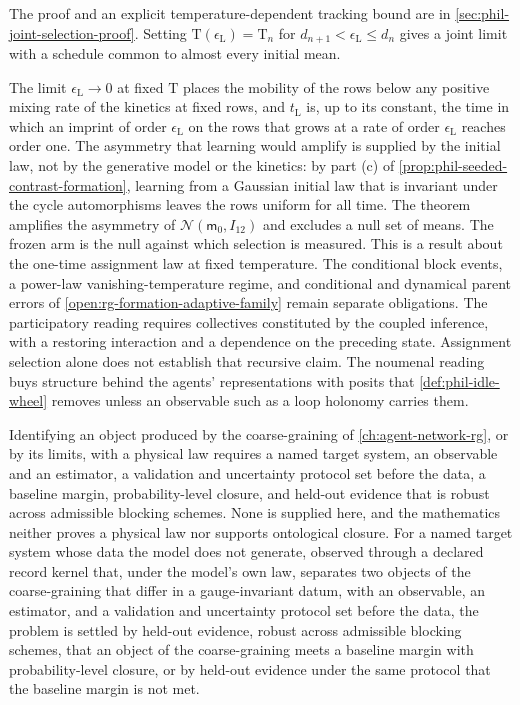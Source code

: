 The proof and an explicit temperature-dependent tracking bound are in
\cref{sec:phil-joint-selection-proof}. Setting
\(\mathrm T(\epsilon_{\mathrm L})=\mathrm T_n\) for
\(d_{n+1}<\epsilon_{\mathrm L}\le d_n\) gives a joint limit with a schedule
common to almost every initial mean.

The limit \(\epsilon_{\mathrm L}\to0\) at fixed \(\mathrm T\) places the
mobility of the rows below any positive mixing rate of the kinetics at fixed
rows, and \(t_{\mathrm L}\) is, up to its constant, the time in which an imprint
of order \(\epsilon_{\mathrm L}\) on the rows that grows at a rate of order
\(\epsilon_{\mathrm L}\) reaches order one. The asymmetry that learning would
amplify is supplied by the initial law, not by the generative model or the
kinetics: by part (c) of \cref{prop:phil-seeded-contrast-formation}, learning
from a Gaussian initial law that is invariant under the cycle automorphisms
leaves the rows uniform for all time. The theorem amplifies the asymmetry of
\(\mathcal N(\mathsf m_0,I_{12})\) and excludes a null set of means. The frozen
arm is the null against which selection is measured. This is a result about
the one-time assignment law at fixed temperature. The conditional block
events, a power-law vanishing-temperature regime, and conditional and dynamical parent
errors of \cref{open:rg-formation-adaptive-family} remain separate obligations.
The participatory reading requires collectives constituted by the coupled
inference, with a restoring interaction and a dependence on the preceding
state. Assignment selection alone does not establish that recursive claim. The noumenal reading buys structure behind the
agents' representations with posits that \cref{def:phil-idle-wheel} removes
unless an observable such as a loop holonomy carries them.

Identifying an object produced by the coarse-graining of
\cref{ch:agent-network-rg}, or by its limits, with a physical law requires a
named target system, an observable and an estimator, a validation and
uncertainty protocol set before the data, a baseline margin, probability-level
closure, and held-out evidence that is robust across admissible blocking
schemes. None is supplied here, and the mathematics neither proves a physical
law nor supports ontological closure. For a named target system whose data the
model does not generate, observed through a declared record kernel that, under
the model's own law, separates two objects of the coarse-graining that differ
in a gauge-invariant datum, with an observable, an estimator, and a validation
and uncertainty protocol set before the data, the problem is settled by
held-out evidence, robust across admissible blocking schemes, that an object of
the coarse-graining meets a baseline margin with probability-level closure, or
by held-out evidence under the same protocol that the baseline margin is not
met.

